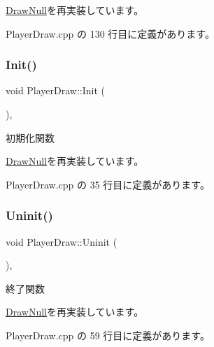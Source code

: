 \mbox{\hyperlink{class_draw_null_abdb03713b973fd1f65c914fa146414a1}{Draw\+Null}}を再実装しています。



 Player\+Draw.\+cpp の 130 行目に定義があります。

\mbox{\label{class_player_draw_ad79a0fbeb618e0913822b573e5d0be68}} 
\subsubsection{\texorpdfstring{Init()}{Init()}}
{\footnotesize\ttfamily void Player\+Draw\+::\+Init (\begin{DoxyParamCaption}{ }\end{DoxyParamCaption})\hspace{0.3cm}{\ttfamily [override]}, {\ttfamily [virtual]}}



初期化関数 



\mbox{\hyperlink{class_draw_null_a20aef1e54c1a158b741bfd731e18efdf}{Draw\+Null}}を再実装しています。



 Player\+Draw.\+cpp の 35 行目に定義があります。

\mbox{\label{class_player_draw_a917b2947914287f23d87ca75cd68f553}} 
\subsubsection{\texorpdfstring{Uninit()}{Uninit()}}
{\footnotesize\ttfamily void Player\+Draw\+::\+Uninit (\begin{DoxyParamCaption}{ }\end{DoxyParamCaption})\hspace{0.3cm}{\ttfamily [override]}, {\ttfamily [virtual]}}



終了関数 



\mbox{\hyperlink{class_draw_null_a6e81d63efab7333e8d0e8af99362a4d9}{Draw\+Null}}を再実装しています。



 Player\+Draw.\+cpp の 59 行目に定義があります。




